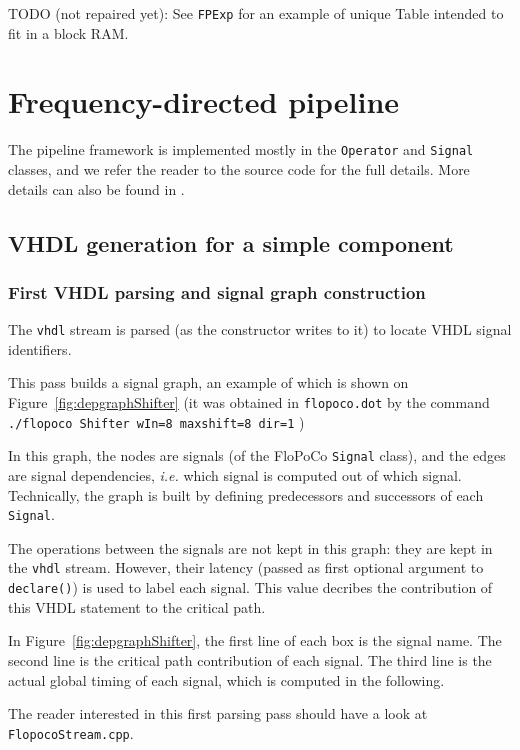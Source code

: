 \documentclass{article}
\begin{document}
TODO (not repaired yet): See \texttt{FPExp} for an example of unique Table intended to fit in a block RAM.


\section{Frequency-directed pipeline}

The  pipeline framework  is implemented mostly in the \texttt{Operator} and \texttt{Signal} classes, and we refer the reader to the source code for the full  details.
More details can also be found in \cite{istoan:hal-01373937}.

\subsection{VHDL generation for a simple component}

\subsubsection{First VHDL parsing and signal graph construction}
The \texttt{vhdl} stream is parsed (as the constructor writes to it) to locate VHDL signal identifiers.

This pass builds  a signal graph, an example of which is shown on Figure~\ref{fig:depgraphShifter} 
(it was obtained in \texttt{flopoco.dot} by the command
\verb!./flopoco Shifter wIn=8 maxshift=8 dir=1! )

In this graph, the nodes are signals (of the FloPoCo \texttt{Signal} class), and the edges are signal dependencies, \emph{i.e.} which signal is computed out of which signal.
Technically, the graph is built by defining predecessors and successors of each \texttt{Signal}.

The operations between the signals are not kept in this graph: they are kept in the \texttt{vhdl} stream.
  However, their latency (passed as first optional argument to  \texttt{declare()}) is used to label each signal.
  This value decribes the contribution of this VHDL statement to the critical path.

  In Figure~\ref{fig:depgraphShifter}, the first line of each box is the signal name.
The second line is the critical path contribution of each signal.
  The third line is the actual global timing of each signal, which is computed in the following. 
  
The reader interested in this first parsing pass should have a look at \texttt{FlopocoStream.cpp}.
\end{document}
